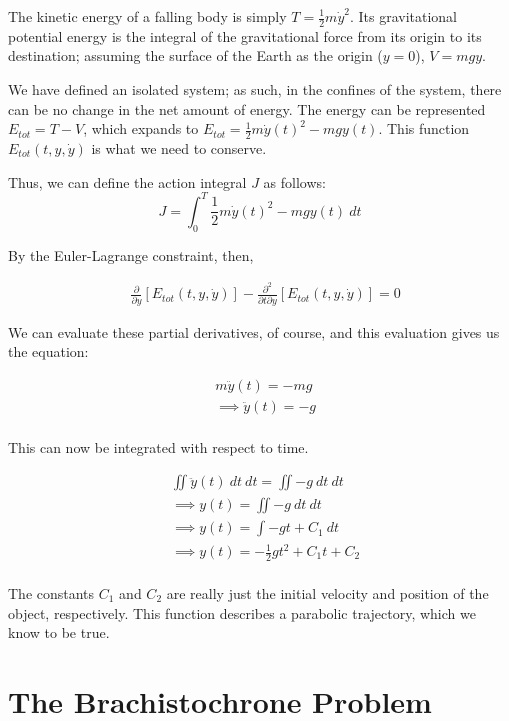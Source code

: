 \documentclass[%
 amsmath,amssymb,
aps,
 fleqn,
 notitlepage,
]{revtex4-2}
\begin{document}
The kinetic energy of a falling body is simply $\displaystyle T = \frac12 m\dot y^2$.  Its gravitational potential energy is the integral of the gravitational force from its origin to its destination; assuming the surface of the Earth as the origin ($y = 0$), $\displaystyle V = mgy$.

We have defined an isolated system; as such, in the confines of the system, there can be no change in the net amount of energy.  The energy can be represented $E_{tot} = T - V$, which expands to $\displaystyle E_{tot} = \frac12m\dot y(t)^2 - mgy(t)$.  This function $E_{tot}(t, y, \dot y)$ is what we need to conserve.

Thus, we can define the action integral $J$ as follows:
\[
    J = \int_0^T \frac12m\dot y(t)^2 - mgy(t) ~ dt
\]

By the Euler-Lagrange constraint, then,

\begin{align*}
  &\frac{∂}{∂y} \left[E_{tot}(t, y, \dot y)\right] - \frac{∂^2}{∂t∂y} \left[E_{tot}(t, y, \dot y)\right] = 0
\end{align*}

We can evaluate these partial derivatives, of course, and this evaluation gives us the equation:

\begin{align*}
  &m\ddot y(t) = -mg\\
  &⟹ \ddot y(t) = -g\\
\end{align*}

This can now be integrated with respect to time.

\begin{align*}
  &\iint \ddot y(t) ~ dt ~ dt = \iint -g ~ dt ~ dt\\
  &⟹ y(t) = \iint -g ~ dt ~ dt\\
  &⟹ y(t) = \int -gt + C_1 ~ dt\\
  &⟹ y(t) = -\frac12gt^2 + C_1t + C_2\\
\end{align*}

The constants $C_1$ and $C_2$ are really just the initial velocity and position of the object, respectively.  This function describes a parabolic trajectory, which we know to be true.

\section{The Brachistochrone Problem} %
\end{document}
